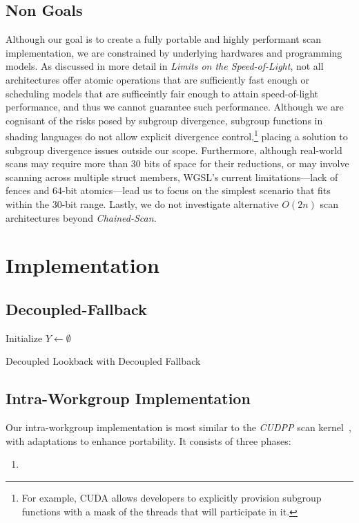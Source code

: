 \documentclass[sigconf]{acmart}
\begin{document}
\subsection{Non Goals}
Although our goal is to create a fully portable and highly performant scan implementation, we are constrained by underlying hardwares and programming models. As discussed in more detail in \emph{Limits on the Speed-of-Light}, not all architectures offer atomic operations that are sufficiently fast enough or scheduling models that are sufficeintly fair enough to attain speed-of-light performance, and thus we cannot guarantee such performance. Although we are cognisant of the risks posed by subgroup divergence, subgroup functions in shading languages do not allow explicit divergence control,\footnote{For example, CUDA allows developers to explicitly provision subgroup functions with a mask of the threads that will participate in it.} placing a solution to subgroup divergence issues outside our scope. Furthermore, although real-world scans may require more than 30 bits of space for their reductions, or may involve scanning across multiple struct members, WGSL’s current limitations---lack of fences and 64-bit atomics---lead us to focus on the simplest scenario that fits within the 30-bit range. Lastly, we do not investigate alternative $O(2n)$ scan architectures beyond \emph{Chained-Scan}.

\section{Implementation}

\subsection{Decoupled-Fallback}

\begin{algorithm}[htbp]
  \SetAlgoLined
  Initialize $Y \leftarrow \emptyset$\;
  \;
  \caption{Decoupled Lookback with Decoupled Fallback}
  \label{alg:example}
\end{algorithm}

\subsection{Intra-Workgroup Implementation}
Our intra-workgroup implementation is most similar to the \emph{CUDPP} scan kernel~\cite{}, with adaptations to enhance portability. It consists of three phases:
\begin{enumerate}
  \item
\end{enumerate}
\end{document}
